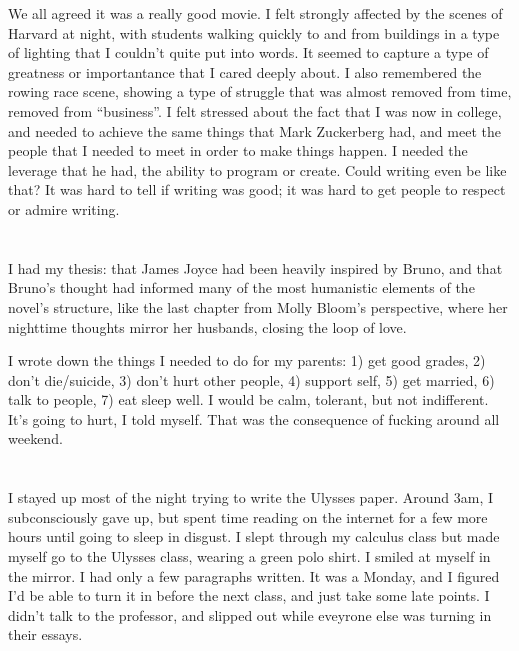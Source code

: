 We all agreed it was a really good movie.  I felt strongly affected by the
scenes of Harvard at night, with students walking quickly to and from buildings
in a type of lighting that I couldn't quite put into words.  It seemed to
capture a type of greatness or importantance that I cared deeply about.  I also
remembered the rowing race scene, showing a type of struggle that was almost
removed from time, removed from ``business''.  I felt stressed about the fact
that I was now in college, and needed to achieve the same things that Mark
Zuckerberg had, and meet the people that I needed to meet in order to make
things happen.  I needed the leverage that he had, the ability to program or
create.  Could writing even be like that?  It was hard to tell if writing was
good; it was hard to get people to respect or admire writing.

\section{}

I had my thesis: that James Joyce had been heavily inspired by Bruno, and that
Bruno's thought had informed many of the most humanistic elements of the novel's
structure, like the last chapter from Molly Bloom's perspective, where her
nighttime thoughts mirror her husbands, closing the loop of love.

I wrote down the things I needed to do for my parents: 1) get good grades, 2)
don't die/suicide, 3) don't hurt other people, 4) support self, 5) get married,
6) talk to people, 7) eat sleep well.  I would be calm, tolerant, but not
indifferent.  It's going to hurt, I told myself.  That was the consequence of
fucking around all weekend.


\section{}

I stayed up most of the night trying to write the Ulysses paper.   Around 3am, I
subconsciously gave up, but spent time reading on the internet for a few more
hours until going to sleep in disgust.  I slept through my calculus class but
made myself go to the Ulysses class, wearing a green polo shirt.  I smiled at
myself in the mirror.  I had only a few paragraphs written.  It was a Monday,
and I figured I'd be able to turn it in before the next class, and just take
some late points.  I didn't talk to the professor, and slipped out while
eveyrone else was turning in their essays.  

